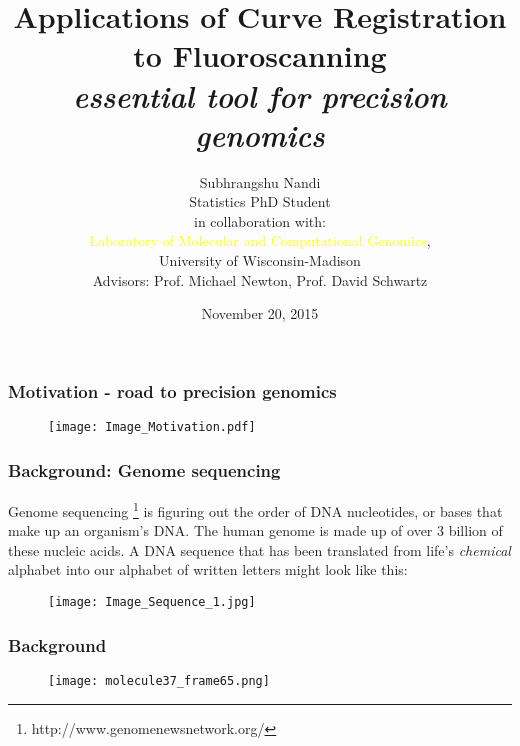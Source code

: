 \documentclass[10pt,dvipsnames,table, notes]{beamer}
\title[Curve Registration in Fluoroscanning]{Applications of Curve Registration to Fluoroscanning\\ {\emph{essential tool for precision genomics}}}
\author{Subhrangshu Nandi \\
Statistics PhD Student \\
\vspace{1cm}
\small{in collaboration with:} \\
\textcolor{yellow}{Laboratory of Molecular and Computational Genomics}, \\
University of Wisconsin-Madison \\
Advisors: Prof. Michael Newton, Prof. David Schwartz}
\date{November 20, 2015}
\begin{document}
\setlength{\baselineskip}{16truept}
\frame{\maketitle}




\begin{frame}
\frametitle{Motivation - road to precision genomics}
\begin{figure}[T]
\texttt{[image: Image\_Motivation.pdf]}
\end{figure}


\end{frame}

\begin{frame}
\frametitle{Background: Genome sequencing}
Genome sequencing \footnote{http://www.genomenewsnetwork.org/} is figuring out the order of DNA nucleotides, or bases that make up an organism's DNA. The human genome is made up of over 3 billion of these nucleic acids. A DNA sequence that has been translated from life's {\emph{chemical}} alphabet into our alphabet of written letters might look like this:
\begin{figure}[H]
\texttt{[image: Image\_Sequence\_1.jpg]}
\end{figure}

\end{frame}

\begin{frame}
\frametitle{Background}
\begin{figure}[T]
\texttt{[image: molecule37\_frame65.png]}
\end{figure}
\end{frame}
\end{document}
